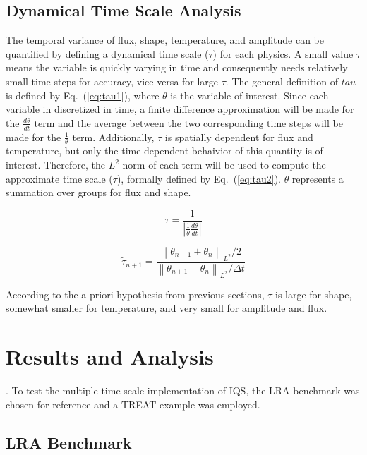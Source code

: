 \documentclass{anstrans}
\newcommand{\eqt}[1]{Eq.~(\ref{#1})}                     %
\newcommand{\be}{\begin{equation}}
\newcommand{\ee}{\end{equation}}
\newcommand{\norm}[1]{\left\lVert#1\right\rVert_{L^2}}
\begin{document}
\subsection{Dynamical Time Scale Analysis}
\label{sect:tau}

The temporal variance of flux, shape, temperature, and amplitude can be quantified by defining a dynamical time scale ($\tau$) for each physics.  A small value $\tau$ means the variable is quickly varying in time and consequently needs relatively small time steps for accuracy, vice-versa for large $\tau$.  The general definition of $tau$ is defined by \eqt{eq:tau1}, where $\theta$ is the variable of interest.  Since each variable in discretized in time, a finite difference approximation will be made for the $\frac{d\theta}{dt}$ term and the average between the two corresponding time steps will be made for the $\frac{1}{\theta}$ term.  Additionally, $\tau$ is spatially dependent for flux and temperature,  but only the time dependent behaivior of this quantity is of interest.  Therefore, the $L^2$ norm of each term will be used to compute the approximate time scale ($\tilde{\tau}$), formally defined by \eqt{eq:tau2}.  $\theta$ represents a summation over groups for flux and shape.

\be
\tau = \frac{1}{\left|\frac{1}{\theta}\frac{d\theta}{dt}\right|}
\label{eq:tau1}
\ee

\be
\tilde{\tau}_{n+1} = \frac{\norm{\theta_{n+1} + \theta_{n}}/2}{\norm{\theta_{n+1} - \theta_{n}}/\Delta t}
\label{eq:tau2}
\ee

According to the a priori hypothesis from previous sections, $\tau$ is large for shape, somewhat smaller for temperature, and very small for amplitude and flux.


\section{Results and Analysis}
.
To test the multiple time scale implementation of IQS, the LRA benchmark was chosen for reference and a TREAT example was employed. 

\subsection{LRA Benchmark}
\end{document}
